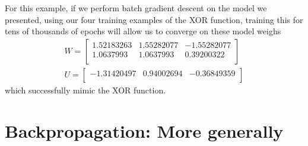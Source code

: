 \documentclass[12pt,letterpaper]{book}
\theoremstyle{definition}
\begin{document}
  For this example, if we perform batch gradient descent on the model we presented, using our 
  four training examples of the XOR function,
  training this for tens of thousands of epochs
  will allow us to converge on these model weighs 
  \begin{align}
    W = 
    \begin{bmatrix}
      1.52183263 & 1.55282077 & -1.55282077 \\
      1.0637993 & 1.0637993 & 0.39200322 \\
    \end{bmatrix}\\
    U = \begin{bmatrix}
      -1.31420497 & 0.94002694 & -0.36849359\\
    \end{bmatrix}
  \end{align}
  which successfully mimic the XOR function.

  
  \section{Backpropagation: More generally}
\end{document}
